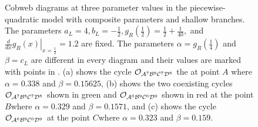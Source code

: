 \begin{figure}
	\centering
	\caption[Cobweb diagrams at three parameter values in the piecewise-quadratic model with composite parameters and shallow branches]{
	Cobweb diagrams at three parameter values in the piecewise-quadratic model with composite parameters and shallow branches.
	The parameters $a_L = 4, b_L = -\frac{1}{2}, g_R\left(\frac{1}{2}\right) = \frac{1}{2} + \frac{1}{40},$ and $\left. \frac{d}{dx} g_R\left(x\right) \right|_{x = \frac{1}{2}} = 1.2$ are fixed.
	The parameters $\alpha = g_R\left(\frac{1}{4}\right)$ and $\beta = c_L$ are different in every diagram and their values are marked with points in .
	(a) shows the cycle $\mathcal{O}_{\mathcal{A}^7\mathcal{B}^8\mathcal{C}^7\mathcal{D}^8}$ the at point $A$ where $\alpha = 0.338$ and $\beta = 0.15625$,
	(b) shows the two coexisting cycles $\mathcal{O}_{\mathcal{A}^7\mathcal{B}^8\mathcal{C}^7\mathcal{D}^8}$ shown in green and $\mathcal{O}_{\mathcal{A}^6\mathcal{B}^9\mathcal{C}^6\mathcal{D}^9}$ shown in red at the point $B$where $\alpha = 0.329$ and $\beta = 0.1571$,
	and (c) shows the cycle $\mathcal{O}_{\mathcal{A}^6\mathcal{B}^9\mathcal{C}^6\mathcal{D}^9}$ at the point $C$where $\alpha = 0.323$ and $\beta = 0.159$.
	}
	\label{fig:setup.quad.hyper.2.cobwebs}
\end{figure}

